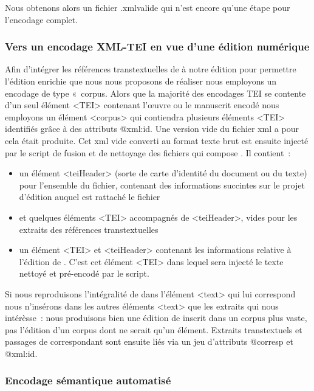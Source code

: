\documentclass[12pt, a4paper]{article}
\begin{document}
Nous obtenons alors un fichier \go.xml\gf valide qui n'est encore qu'une étape pour l'encodage complet.

\subsubsection{Vers un encodage XML-TEI en vue d'une édition numérique}
\label{tei}

Afin d'intégrer les références transtextuelles de \punr{} à notre édition pour permettre l'édition enrichie que nous nous proposons de réaliser nous employons un encodage de type «~corpus\gf. 
Alors que la majorité des encodages TEI se contente d'un seul élément <TEI> contenant l'œuvre ou le manuscrit encodé nous employons un élément <corpus> qui contiendra plusieurs éléments <TEI> identifiés grâce à des attributs @xml:id. Une version vide du fichier xml a pour cela était produite. Cet xml vide converti au format texte brut est ensuite injecté par le script de fusion et de nettoyage des fichiers qui compose \punr. Il contient~:
\begin{itemize}
    \item un élément <teiHeader> (sorte de carte d'identité du document ou du texte) pour l'ensemble du fichier, contenant des informations succintes sur le projet d'édition auquel est rattaché le fichier
    \item et quelques éléments <TEI> accompagnés de <teiHeader>, vides pour les extraits des références transtextuelles
    \item un élément <TEI> et <teiHeader> contenant les informations relative à l'édition de \punr. C'est cet élément <TEI> dans lequel sera injecté le texte nettoyé et pré-encodé par le script.
\end{itemize}

Si nous reproduisons l'intégralité de \punr{} dans l'élément <text> qui lui correspond nous n'insérons dans les autres éléments <text> que les extraits qui nous intérèsse~: nous produisons bien une édition de \punr{} inscrit dans un corpus plus vaste, pas l'édition d'un corpus dont \punr{} ne serait qu'un élément. Extraits transtextuels et passages de \punr{} correspondant sont ensuite liés via un jeu d'attributs @corresp et @xml:id.
\subsubsection{Encodage sémantique automatisé}
\end{document}
